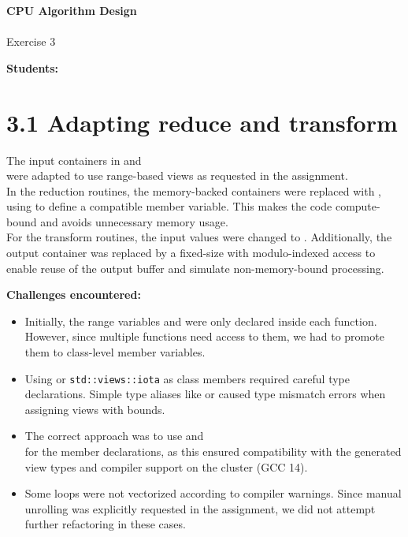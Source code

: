 





\begin{Large}
    \textsf{\textbf{CPU Algorithm Design}} \\
    \\
    Exercise 3
\end{Large}
\vspace{1ex}
\textsf{\textbf{Students:}}  \\
\vspace{2ex}

\section*{3.1 Adapting reduce and transform}

The input containers in  and \\
 were adapted to use range-based views as requested in the assignment. \\
In the reduction routines, the memory-backed containers were replaced with ,
using  to define a compatible member variable. This makes the code compute-bound and avoids unnecessary memory usage. \\
For the transform routines, the input values were changed to . Additionally, the output container  was replaced by a fixed-size  with modulo-indexed access to enable reuse of the output buffer and simulate non-memory-bound processing.

\textbf{Challenges encountered:}
\begin{itemize}
    \item Initially, the range variables  and  were only declared inside each function. However, since multiple functions need access to them, we had to promote them to class-level member variables.
    \item Using  or \texttt{std::views::iota} as class members required careful type declarations. Simple type aliases like  or  caused type mismatch errors when assigning views with bounds.
    \item The correct approach was to use  and \\
           for the member declarations, as this ensured compatibility with the generated view types and compiler support on the cluster (GCC 14).
    \item Some loops were not vectorized according to compiler warnings. Since manual unrolling was explicitly requested in the assignment, we did not attempt further refactoring in these cases.
\end{itemize}

